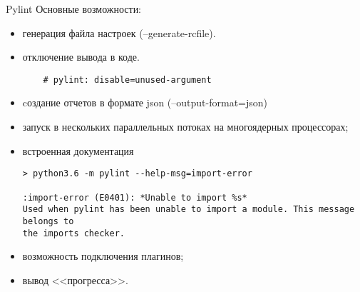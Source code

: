 \documentclass[xcolor=table]{beamer}
\begin{document}
\begin{frame}[fragile]{Pylint}
	Основные возможности:
	\begin{itemize}
		\item генерация файла настроек (--generate-rcfile). 
		\item отключение вывода в коде. 		
		\begin{verbatim}
	# pylint: disable=unused-argument
		\end{verbatim}
		\item cоздание отчетов в формате json (--output-format=json)		
		\item запуск в нескольких параллельных потоках на многоядерных процессорах;
		\item встроенная документация
		\begin{verbatim}
> python3.6 -m pylint --help-msg=import-error

:import-error (E0401): *Unable to import %s*
Used when pylint has been unable to import a module. This message belongs to
the imports checker.
		\end{verbatim}
		\item возможность подключения плагинов;		
		\item вывод <<прогресса>>.
	\end{itemize}

\end{frame}

\end{document}
